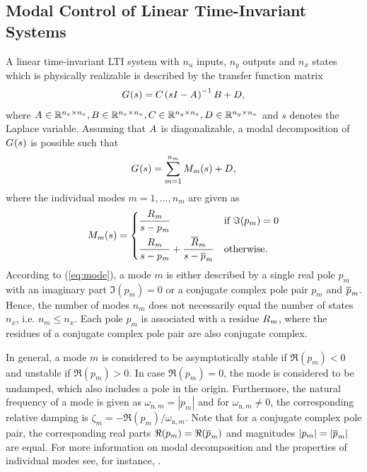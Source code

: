 \documentclass[aerospace,article,submit,moreauthors,pdftex,10pt,a4paper]{Definitions/mdpi}
\begin{document}
\subsection{Modal Control of Linear Time-Invariant Systems}
\label{sec:description}
A  linear time-invariant \ac{LTI} system with $n_u$ inputs, $n_y$ outputs and $n_x$ states which is physically realizable is described by the transfer function matrix
%
\begin{align}
\label{eq:tfm}
\aemat{G}{}(s)=
\aemat{C}{}\left(s\aemat{I}{}-\aemat{A}{}\right)^{-1} \aemat{B}{} + \aemat{D}{},
\end{align}
where
%
$
\aemat{A}{} \in \mathbb{R}^{n_x \times n_x},
\aemat{B}{} \in \mathbb{R}^{n_x \times n_u},
\aemat{C}{} \in \mathbb{R}^{n_y \times n_x},
\aemat{D}{} \in \mathbb{R}^{n_y \times n_u}
$
%
and $s$ denotes the Laplace variable.
%
Assuming that $\aemat{A}{}$ is diagonalizable, a modal decomposition of $\aemat{G}{}(s)$ is possible such that
%
\begin{align*}
\aemat{G}{}(s)=\sum^{n_m}_{m=1} \aemat{M}{m}(s) + \aemat{D}{},
\end{align*}
%
where the individual modes $m=1,...,n_m$ are given as
%
\begin{align}
\label{eq:mode}
\aemat{M}{m}(s)=
\begin{cases}
\dfrac{\aemat{R}{m}}{s- \aesym{p}{m}} &
\text{if } \Im{(p_m)}=0 \\[2ex]
\dfrac{\aemat{R}{m}}{s- \aesym{p}{m}} + 
\dfrac{\aematb{R}{m}}{s-\aesymb{p}{m}} &
\text{otherwise.}
\end{cases}
\end{align}
%
According to (\ref{eq:mode}), a mode $m$ is either described by a single real pole $p_m$ with an imaginary part $\Im{(p_m)}=0$  or a conjugate complex pole pair $p_m$ and $\aesymb{p}{m}$. 
Hence, the number of modes $n_m$ does not necessarily equal the number of states $n_x$, i.e. $n_m \leq n_x$.
Each pole $p_m$ is associated with a residue 
$\aemat{R}{m}$,
where the residues of a conjugate complex pole pair are also conjugate complex.

In general, a mode $m$ is considered to be asymptotically stable if $\Re{(p_m)}<0$ and unstable if $\Re{(p_m)}>0$. In case $\Re{(p_m)}=0$, the mode is considered to be undamped, which also includes a pole in the origin. 
Furthermore, the natural frequency of a mode is given as
$\omega_{\text{n},m} = |p_m| $
and for $\omega_{\text{n},m} \neq 0$, the corresponding relative damping is
$\zeta_m = -\Re{(p_m)} / \omega_{\text{n},m}$. 
Note that for a conjugate complex pole pair, the corresponding real parts $\Re{(p_m)}=\Re{(\aesymb{p}{m})}$ and magnitudes $|p_m|=|\aesymb{p}{m}|$ are equal. For more information on modal decomposition and the properties of individual modes see, for instance, \cite{Skoge_05}.
\end{document}

